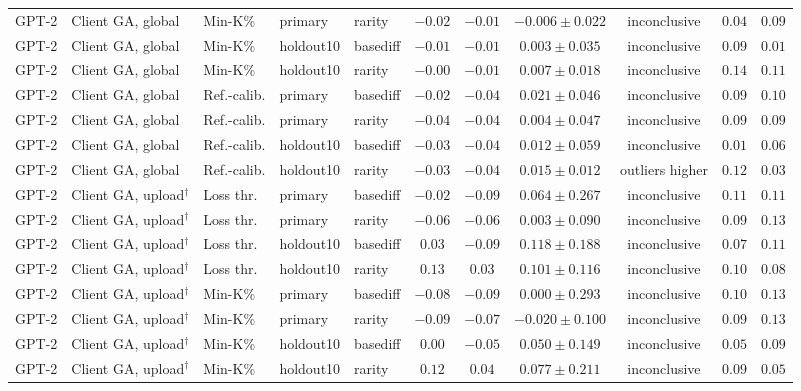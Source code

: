{\begin{longtable}{@{\extracolsep{\fill}}lllllcccccc@{}}
GPT-2 & Client GA, global & Min-K\% & primary & rarity & $-0.02$ & $-0.01$ & $-0.006 \pm 0.022$ & inconclusive & $0.04$ & $0.09$ \\
GPT-2 & Client GA, global & Min-K\% & holdout10 & basediff & $-0.01$ & $-0.01$ & $0.003 \pm 0.035$ & inconclusive & $0.09$ & $0.01$ \\
GPT-2 & Client GA, global & Min-K\% & holdout10 & rarity & $-0.00$ & $-0.01$ & $0.007 \pm 0.018$ & inconclusive & $0.14$ & $0.11$ \\
GPT-2 & Client GA, global & Ref.-calib. & primary & basediff & $-0.02$ & $-0.04$ & $0.021 \pm 0.046$ & inconclusive & $0.09$ & $0.10$ \\
GPT-2 & Client GA, global & Ref.-calib. & primary & rarity & $-0.04$ & $-0.04$ & $0.004 \pm 0.047$ & inconclusive & $0.09$ & $0.09$ \\
GPT-2 & Client GA, global & Ref.-calib. & holdout10 & basediff & $-0.03$ & $-0.04$ & $0.012 \pm 0.059$ & inconclusive & $0.01$ & $0.06$ \\
GPT-2 & Client GA, global & Ref.-calib. & holdout10 & rarity & $-0.03$ & $-0.04$ & $0.015 \pm 0.012$ & outliers higher & $0.12$ & $0.03$ \\
GPT-2 & Client GA, upload$^{\dagger}$ & Loss thr. & primary & basediff & $-0.02$ & $-0.09$ & $0.064 \pm 0.267$ & inconclusive & $0.11$ & $0.11$ \\
GPT-2 & Client GA, upload$^{\dagger}$ & Loss thr. & primary & rarity & $-0.06$ & $-0.06$ & $0.003 \pm 0.090$ & inconclusive & $0.09$ & $0.13$ \\
GPT-2 & Client GA, upload$^{\dagger}$ & Loss thr. & holdout10 & basediff & $0.03$ & $-0.09$ & $0.118 \pm 0.188$ & inconclusive & $0.07$ & $0.11$ \\
GPT-2 & Client GA, upload$^{\dagger}$ & Loss thr. & holdout10 & rarity & $0.13$ & $0.03$ & $0.101 \pm 0.116$ & inconclusive & $0.10$ & $0.08$ \\
GPT-2 & Client GA, upload$^{\dagger}$ & Min-K\% & primary & basediff & $-0.08$ & $-0.09$ & $0.000 \pm 0.293$ & inconclusive & $0.10$ & $0.13$ \\
GPT-2 & Client GA, upload$^{\dagger}$ & Min-K\% & primary & rarity & $-0.09$ & $-0.07$ & $-0.020 \pm 0.100$ & inconclusive & $0.09$ & $0.13$ \\
GPT-2 & Client GA, upload$^{\dagger}$ & Min-K\% & holdout10 & basediff & $0.00$ & $-0.05$ & $0.050 \pm 0.149$ & inconclusive & $0.05$ & $0.09$ \\
GPT-2 & Client GA, upload$^{\dagger}$ & Min-K\% & holdout10 & rarity & $0.12$ & $0.04$ & $0.077 \pm 0.211$ & inconclusive & $0.09$ & $0.05$ \\

\end{longtable}}
